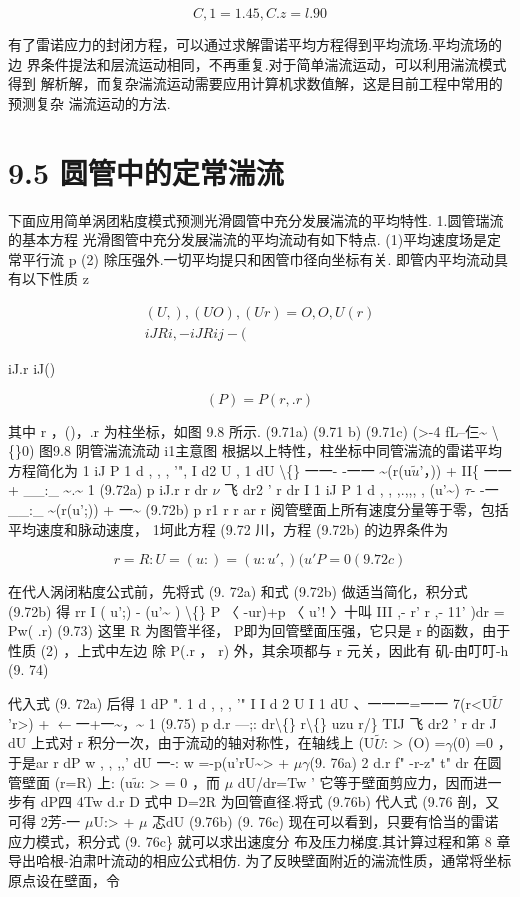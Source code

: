 \[C,1 = 1. 45 , C.z = l. 90\]

有了雷诺应力的封闭方程，可以通过求解雷诺平均方程得到平均流场.平均流场的边 界条件提法和层流运动相同，不再重复.对于简单湍流运动，可以利用湍流模式得到 解析解，而复杂湍流运动需要应用计算机求数值解，这是目前工程中常用的预测复杂 湍流运动的方法.

\section*{9.5  圆管中的定常湍流}

下面应用简单涡团粘度模式预测光滑圆管中充分发展湍流的平均特性. 1.圆管瑞流的基本方程 光滑图管中充分发展湍流的平均流动有如下特点. (1)平均速度场是定常平行流 p (2) 除压强外.一切平均提只和困管巾径向坐标有关. 即管内平均流动具有以下性质 z

\begin{gather*}
(U ,), (UO) , (U r ) = O , O, U(r)\\
iJRi, - iJRij - ( 
\end{gather*}

iJ.r iJ()

\[(P) = P(r ,.r)\]

其中 r ，()，.r 为柱坐标，如图 9.8 所示. (9.71a) (9.71 b) (9.71c) (>-4 fL--仨\textasciitilde{} \textbackslash\{\}0) 图9.8 阴管湍流流动 i1主意图 根据以上特性，柱坐标中同管湍流的雷诺平均方程简化为 1 iJ P 1 d , , , '", I d2 U , 1 dU \textbackslash\{\} 一一- -一一 \textasciitilde{}(r(u$\tilde{u}$'，)) + II\{ 一一+ \_\_:\_ \textasciitilde{}.\textasciitilde{} 1 (9.72a) p iJ.r r dr $\nu$ 飞 dr2 ' r dr I 1 iJ P 1 d , , ,.,,, , (u'\textasciitilde{}) $\tau$- -一\_\_:\_ \textasciitilde{}(r(u';)) + 一\textasciitilde{} (9.72b) p r1 r r ar r 阅管壁面上所有速度分量等于零，包括平均速度和脉动速度， 1坷此方程 (9.72 川，方程 (9.72b) 的边界条件为

\[r = R:U = (u:) = (u:u' ,) (u'P = 0 (9. 72c)\]

在代人涡闭粘度公式前，先将式 (9. 72a) 和式 (9.72b) 做适当简化，积分式 (9.72b) 得  rr I ( u';) - (u'\textasciitilde{} ) \textbackslash\{\} P 〈 -ur)+p 〈 u'! 〉十叫 III ,- r' r ,- 11' )dr = Pw( .r) (9.73) 这里 R 为图管半径， P即为回管壁面压强，它只是 r 的函数，由于性质 (2) ，上式中左边 除 P(.r ， r) 外，其余项都与 r 元关，因此有 矶-由叮叮-h (9. 74)

代入式 (9. 72a) 后得 1 dP ". 1 d , , , '" I I d 2 U I 1 dU 、一一一=一一 7(r<U$\tilde{U}$'r>) + $\leftarrow$一+一\textasciitilde{}，\textasciitilde{} 1 (9.75) p d.r ---;: dr\textbackslash\{\} r\textbackslash\{\} uzu r/\} TIJ 飞 dr2 ' r dr J dU 上式对 r 积分一次，由于流动的轴对称性，在轴线上 (U$\tilde{U}$: > (O) =$\gamma$(0) =0 ，于是ar r dP w , , ,,' dU 一-: w =-p(u'rU\textasciitilde{}> + $\mu$$\gamma$(9. 76a) 2 d.r f" -r-z" t" dr 在圆管壁面 (r=R) 上: (u$\tilde{u}$: > = 0 ，而 $\mu$ dU/dr=Tw ' 它等于壁面剪应力，因而进一 步有 dP四 4Tw d.r D 式中 D=2R 为回管直径.将式 (9.76b) 代人式 (9.76 剖，又可得 2芳-一 $\mu$U:> + $\mu$ 忑dU (9.76b) (9. 76c) 现在可以看到，只要有恰当的雷诺应力模式，积分式 (9. 76c\} 就可以求出速度分 布及压力梯度.其计算过程和第 8 章导出哈根-泊肃叶流动的相应公式相仿. 为了反映壁面附近的湍流性质，通常将坐标原点设在壁面，令

